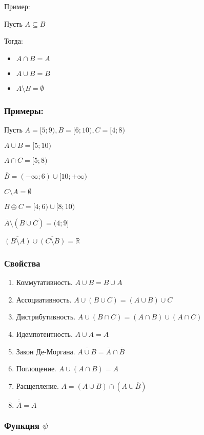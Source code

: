 \documentclass{article}
\begin{document}
Пример:

Пусть $A \subseteq B$

Тогда:
\begin{itemize}
	\item $A \cap B = A$
	\item $A \cup B = B$
	\item $A \setminus B = \emptyset$
\end{itemize}

\subsubsection*{Примеры:}

Пусть $A = [5; 9), B = [6; 10), C = [4; 8)$

$A \cup B = [5; 10)$

$A \cap C = [5; 8)$

$\overline{B} = (-\infty; 6) \cup [10; +\infty)$

$C \setminus A = \emptyset$

$B \oplus C = [4; 6) \cup [8; 10)$

$\overline{A} \setminus (B \cup \overline{C}) = (4; 9]$

$\overline{(B \setminus A)} \cup \overline{(C \setminus B)} = \mathbb{R}$

\subsubsection{Свойства}

\begin{enumerate}
	\item Коммутативность. $A \cup B = B \cup A$
	\item Ассоциативность. $A \cup (B \cup C) = (A \cup B) \cup C$
	\item Дистрибутивность. $A \cup (B \cap C) = (A \cap B) \cup (A \cap C)$
	\item Идемпотентность. $A \cup A = A$
	\item Закон Де-Моргана. $\overline{A \cup B} = \overline{A} \cap \overline{B}$
	\item Поглощение. $A \cup (A \cap B) = A$
	\item Расщепление. $A = (A \cup B) \cap (A \cup \overline{B})$
	\item $\overline{\overline{A}} = A$
\end{enumerate}

\subsubsection{Функция $\psi$}
\end{document}
